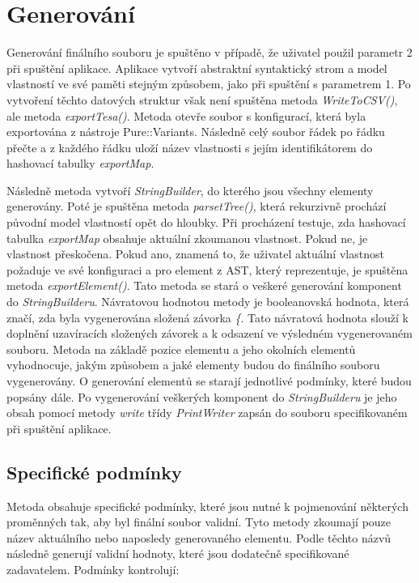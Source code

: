 \section{Generování}
Generování finálního souboru je spuštěno v případě, že uživatel použil parametr 2 při spuštění aplikace. Aplikace vytvoří abstraktní syntaktický strom a model vlastností ve své paměti stejným způsobem, jako při spuštění s parametrem 1. Po vytvoření těchto datových struktur však není spuštěna metoda \textit{WriteToCSV()}, ale metoda \textit{exportTesa()}. Metoda otevře soubor s konfigurací, která byla exportována z nástroje Pure::Variants. Následně celý soubor řádek po řádku přečte a z každého řádku uloží název vlastnosti s jejím identifikátorem do hashovací tabulky \textit{exportMap}.

Následně metoda vytvoří \textit{StringBuilder}, do kterého jsou všechny elementy generovány. Poté je spuštěna metoda \textit{parsetTree()}, která rekurzivně prochází původní model vlastností opět do hloubky. Při procházení testuje, zda hashovací tabulka \textit{exportMap} obsahuje aktuální zkoumanou vlastnost. Pokud ne, je vlastnost přeskočena. Pokud ano, znamená to, že uživatel aktuální vlastnost požaduje ve své konfiguraci a pro element z AST, který reprezentuje, je spuštěna metoda \textit{exportElement()}. Tato metoda se stará o veškeré generování komponent do \textit{StringBuilderu}. Návratovou hodnotou metody je booleanovská hodnota, která značí, zda byla vygenerována složená závorka \textit{\{}. Tato návratová hodnota slouží k doplnění uzavíracích složených závorek a k odsazení ve výsledném vygenerovaném souboru. Metoda na základě pozice elementu a jeho okolních elementů vyhodnocuje, jakým způsobem a jaké elementy budou do finálního souboru vygenerovány. O generování elementů se starají jednotlivé podmínky, které budou popsány dále. Po vygenerování veškerých komponent do \textit{StringBuilderu} je jeho obsah pomocí metody \textit{write} třídy \textit{PrintWriter} zapsán do souboru specifikovaném při spuštění aplikace.

\subsection{Specifické podmínky}
Metoda obsahuje specifické podmínky, které jsou nutné k pojmenování některých proměnných tak, aby byl finální soubor validní. Tyto metody zkoumají pouze název aktuálního nebo naposledy generovaného elementu. Podle těchto názvů následně generují validní hodnoty, které jsou dodatečně specifikované zadavatelem. Podmínky kontrolují: 

